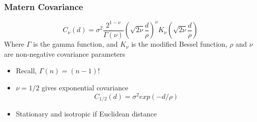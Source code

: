 \documentclass{article}
\begin{document}
\subsubsection*{Matern Covariance}
$$ C_{\nu}(d) = \sigma^{2} \frac{2^{1 - \nu}}{\Gamma(\nu)} \left( \sqrt{2 \nu} \frac{d}{\rho} \right)^{\nu} K_{\nu} \left( \sqrt{2\nu}\frac{d}{\rho} \right) $$
Where $\Gamma$ is the gamma function, and $K_{\nu}$ is the modified Bessel function, $\rho$ and $\nu$ are non-negative covariance parameters
\begin{itemize}
\item Recall, $\Gamma(n) = (n-1)!$
\item $\nu = 1/2$ gives exponential covariance 
$$C_{1/2}(d) = \sigma^{2} exp(-d/\rho)$$
\item Stationary and isotropic if Euclidean distance
\end{itemize}
\end{document}

